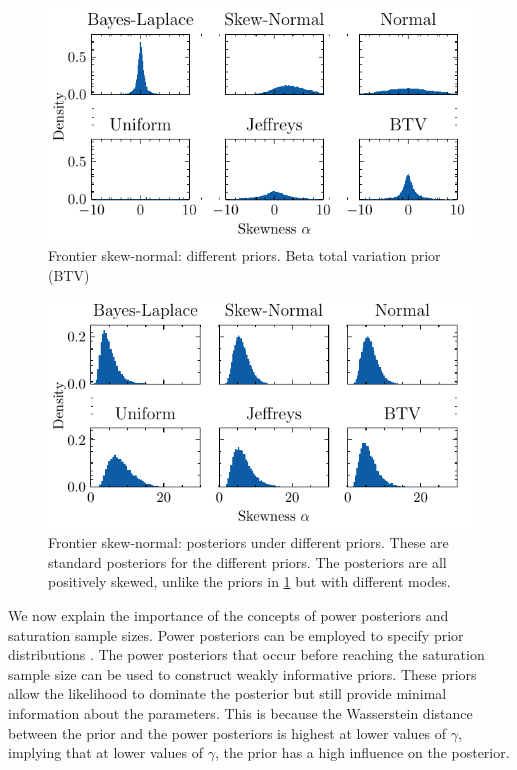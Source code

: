 \documentclass[12pt]{article}
\begin{document}
\begin{figure}
	\begin{center}
		\includegraphics{imgs/prior_histograms1.pdf}
	\end{center}
	\caption{Frontier skew-normal: different priors. Beta total variation prior (BTV)}\label{fig:skew_prior}
\end{figure}
\begin{figure}
	\begin{center}
		\includegraphics{imgs/posterior_histograms1.pdf}
	\end{center}
	\caption{Frontier skew-normal: posteriors under different priors. These are standard posteriors for the different priors. The posteriors are all positively skewed, unlike the priors in \cref{fig:skew_prior} but with different modes.
	}\label{fig:skew_pos}
\end{figure}

We now explain the importance of the concepts of power posteriors and saturation sample sizes. Power posteriors can be employed to specify prior distributions \citep{ohaganPropertiesIntrinsicFractional1997}. The power posteriors that occur before reaching the saturation sample size can be used to construct weakly informative priors. These priors allow the likelihood to dominate the posterior but still provide minimal information about the parameters. This is because the Wasserstein distance between the prior and the power posteriors is highest at lower values of $\gamma$, implying that at lower values of $\gamma$, the prior has a high influence on the posterior.
\end{document}
